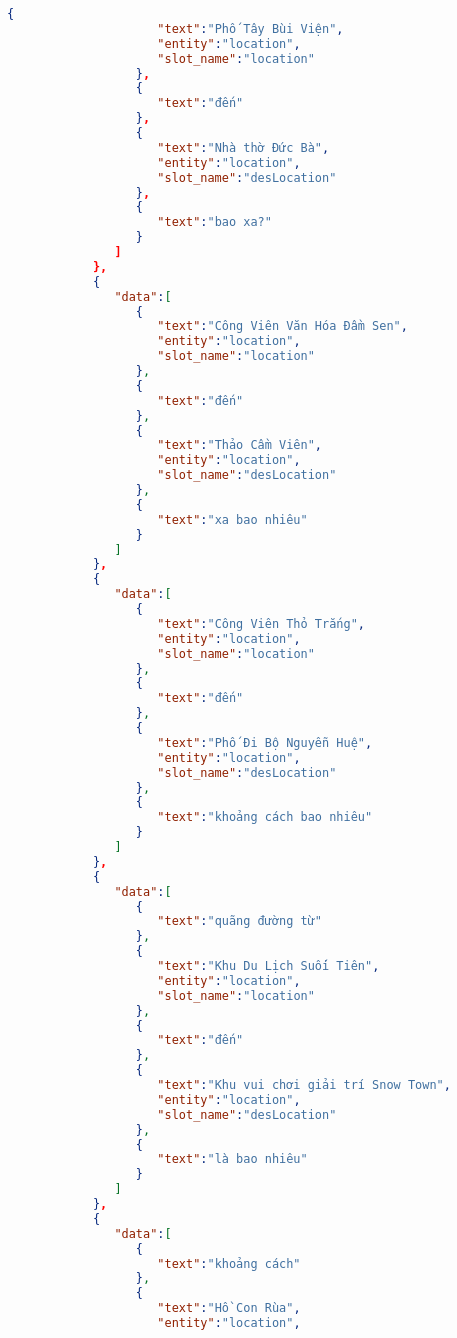 \begin{lstlisting}[language=json,firstnumber=1]
                  {
                     "text":"Phố Tây Bùi Viện",
                     "entity":"location",
                     "slot_name":"location"
                  },
                  {
                     "text":"đến"
                  },
                  {
                     "text":"Nhà thờ Đức Bà",
                     "entity":"location",
                     "slot_name":"desLocation"
                  },
                  {
                     "text":"bao xa?"
                  }
               ]
            },
            {
               "data":[
                  {
                     "text":"Công Viên Văn Hóa Đầm Sen",
                     "entity":"location",
                     "slot_name":"location"
                  },
                  {
                     "text":"đến"
                  },
                  {
                     "text":"Thảo Cầm Viên",
                     "entity":"location",
                     "slot_name":"desLocation"
                  },
                  {
                     "text":"xa bao nhiêu"
                  }
               ]
            },
            {
               "data":[
                  {
                     "text":"Công Viên Thỏ Trắng",
                     "entity":"location",
                     "slot_name":"location"
                  },
                  {
                     "text":"đến"
                  },
                  {
                     "text":"Phố Đi Bộ Nguyễn Huệ",
                     "entity":"location",
                     "slot_name":"desLocation"
                  },
                  {
                     "text":"khoảng cách bao nhiêu"
                  }
               ]
            },
            {
               "data":[
                  {
                     "text":"quãng đường từ"
                  },
                  {
                     "text":"Khu Du Lịch Suối Tiên",
                     "entity":"location",
                     "slot_name":"location"
                  },
                  {
                     "text":"đến"
                  },
                  {
                     "text":"Khu vui chơi giải trí Snow Town",
                     "entity":"location",
                     "slot_name":"desLocation"
                  },
                  {
                     "text":"là bao nhiêu"
                  }
               ]
            },
            {
               "data":[
                  {
                     "text":"khoảng cách"
                  },
                  {
                     "text":"Hồ Con Rùa",
                     "entity":"location",

\end{lstlisting}
